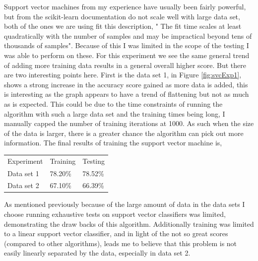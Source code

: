 \documentclass[
	letterpaper, %
]{IEEEtran}
\begin{document}
		Support vector machines from my experience have usually been fairly powerful, but from the scikit-learn\cite{scikit-learn} documentation do not scale well with large data set, both of the ones we are using fit this description, " The fit time scales at least quadratically with the number of samples and may be impractical beyond tens of thousands of samples". Because of this I was limited in the scope of the testing I was able to perform on these. For this experiment we see the same general trend of adding more training data results in a general overall higher score. But there are two interesting points here. First is the data set 1, in Figure \ref{fig:svcExp1}, shows a strong increase in the accuracy score gained as more data is added, this is interesting as the graph appears to have a trend of flattening but not as much as is expected. This could be due to the time constraints of running the algorithm with such a large data set and the training times being long, I manually capped the number of training iterations at 1000. As such when the size of the data is larger, there is a greater chance the algorithm can pick out more information. The final results of training the support vector machine is,
		\begin{center}
			\begin{table}[h]
				\begin{tabular}{lll}
					Experiment & Training & Testing \\
					Data set 1 & 78.20\% & 78.52\% \\
					Data set 2 & 67.10\% & 66.39\%
				\end{tabular}
			\end{table}
		\end{center}
		As mentioned previously because of the large amount of data in the data sets I choose running exhaustive tests on support vector classifiers was limited, demonstrating the draw backs of this algorithm. Additionally training was limited to a linear support vector classifier, and in light of the not so great scores (compared to other algorithms), leads me to believe that this problem is not easily linearly separated by the data, especially in data set 2.
	
\end{document}
